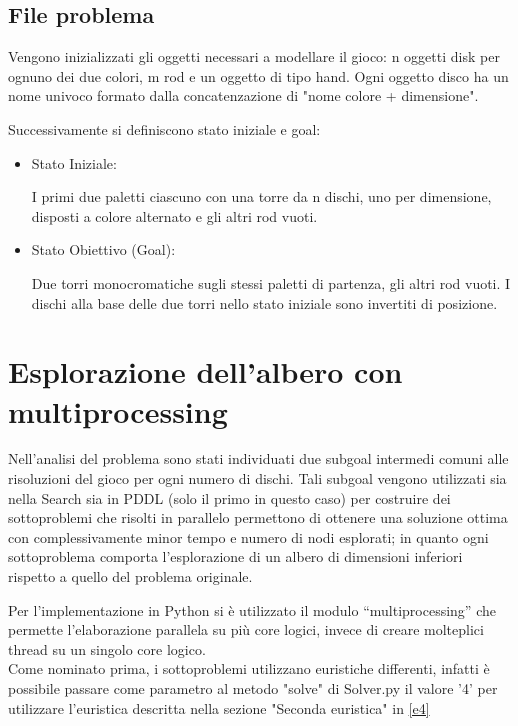 \documentclass{article}
\begin{document}
\subsection{File problema}
Vengono inizializzati gli oggetti necessari a modellare il gioco: n oggetti disk per ognuno dei due colori, m rod e un oggetto di tipo hand. Ogni oggetto disco ha 
un nome univoco formato dalla concatenzazione di "nome colore + dimensione".
\par
Successivamente si definiscono stato iniziale e goal:
\begin{itemize}
  \item Stato Iniziale: 
        
      I primi due paletti ciascuno con una torre da n dischi, uno per dimensione, disposti a colore alternato e gli altri rod vuoti.
  
  \item Stato Obiettivo (Goal): 
        
      Due torri monocromatiche sugli stessi paletti di partenza, gli altri rod vuoti. I dischi alla base delle due torri nello stato iniziale 
      sono invertiti di posizione.
\end{itemize}


\section{Esplorazione dell'albero con multiprocessing}

Nell'analisi del problema sono stati individuati due subgoal intermedi comuni alle risoluzioni 
del gioco per ogni numero di dischi. Tali subgoal vengono utilizzati sia nella Search sia in PDDL (solo il primo in questo caso) per costruire dei sottoproblemi che risolti in parallelo permettono di ottenere una soluzione ottima con complessivamente minor tempo e numero di nodi esplorati; in quanto 
ogni sottoproblema comporta l'esplorazione di un albero di dimensioni inferiori rispetto a quello del problema originale.

Per l'implementazione in Python si è utilizzato il modulo “multiprocessing”  che permette l'elaborazione parallela su più core logici, invece di creare molteplici 
thread su un singolo core logico.\\
Come nominato prima, i sottoproblemi utilizzano euristiche differenti, infatti è possibile passare come parametro al metodo "solve" di Solver.py il valore '4'
per utilizzare l'euristica descritta nella sezione "Seconda euristica" in \ref{e4}

\nocite{*} %

\printbibliography[nottype=online, title=Bibliografia]



\printbibliography[type=online, title=Sitografia]

\end{document}
